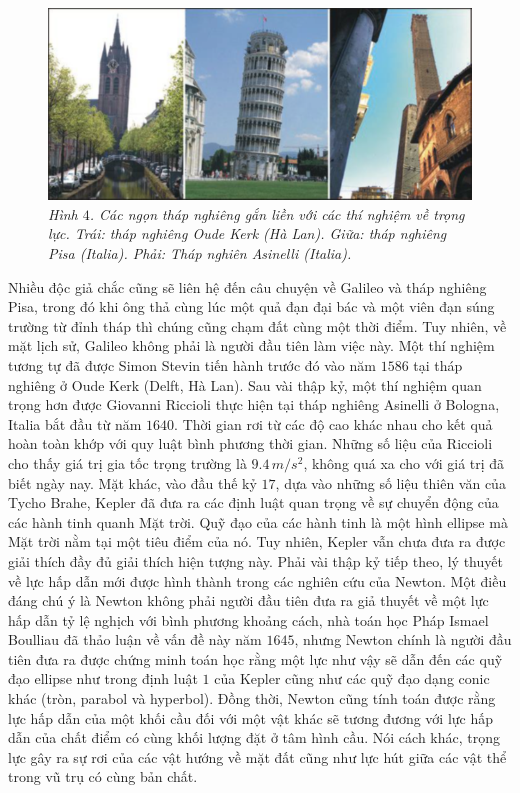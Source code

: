 \begin{multicols}{2}
	\begin{figure}[H]
		\vspace*{-5pt}
		\centering
		\captionsetup{labelformat= empty, justification=centering}
		\includegraphics[width =1\linewidth]{4}
		\caption{\small\textit{\color{timhieukhoahoc}Hình $4$. Các ngọn tháp nghiêng gắn liền với các thí nghiệm về trọng lực. Trái: tháp nghiêng Oude Kerk (Hà Lan). Giữa: tháp nghiêng Pisa (Italia). Phải: Tháp nghiên Asinelli (Italia).}}
		\vspace*{-10pt}
	\end{figure}
	Nhiều độc giả chắc cũng sẽ liên hệ đến câu chuyện về Galileo và tháp nghiêng Pisa, trong đó khi ông thả cùng lúc một quả đạn đại bác và một viên đạn súng trường từ đỉnh tháp thì chúng cũng chạm đất cùng một thời điểm. Tuy nhiên, về mặt lịch sử, Galileo không phải là người đầu tiên làm việc này. Một thí nghiệm tương tự đã được Simon Stevin tiến hành trước đó vào năm $1586$ tại tháp nghiêng ở Oude Kerk (Delft, Hà Lan). Sau vài thập kỷ, một thí nghiệm quan trọng hơn được Giovanni Riccioli thực hiện tại tháp nghiêng Asinelli ở Bologna, Italia bắt đầu từ năm $1640$. Thời gian rơi từ các độ cao khác nhau cho kết quả hoàn toàn khớp với quy luật bình phương thời gian. Những số liệu của Riccioli cho thấy giá trị gia tốc trọng trường là $9{.}4 \,m/s^2$, không quá xa cho với giá trị đã biết ngày nay. 
	\vskip 0.1cm
	Mặt khác, vào đầu thế kỷ $17$, dựa vào những số liệu thiên văn của Tycho Brahe, Kepler đã đưa ra các định luật quan trọng về sự chuyển động của các hành tinh quanh Mặt trời. Quỹ đạo của các hành tinh là một hình ellipse mà Mặt trời nằm tại một tiêu điểm của nó. Tuy nhiên, Kepler vẫn chưa đưa ra được giải thích đầy đủ giải thích hiện tượng này. Phải vài thập kỷ tiếp theo, lý thuyết về lực hấp dẫn mới được hình thành trong các nghiên cứu của Newton. Một điều đáng chú ý là Newton không phải người đầu tiên đưa ra giả thuyết về một lực hấp dẫn tỷ lệ nghịch với bình phương khoảng cách, nhà toán học Pháp Ismael Boulliau đã thảo luận về vấn đề này năm $1645$, nhưng Newton chính là người đầu tiên đưa ra được chứng minh toán học rằng một lực như vậy sẽ dẫn đến các quỹ đạo ellipse như trong định luật $1$ của Kepler cũng như các quỹ đạo dạng conic khác (tròn, parabol và hyperbol). Đồng thời, Newton cũng tính toán được rằng lực hấp dẫn của một khối cầu đối với một vật khác sẽ tương đương với lực hấp dẫn của chất điểm có cùng khối lượng đặt ở tâm hình cầu. Nói cách khác, trọng lực gây ra sự rơi của các vật hướng về mặt đất cũng như lực hút giữa các vật thể trong vũ trụ có cùng bản chất.

\end{multicols}
